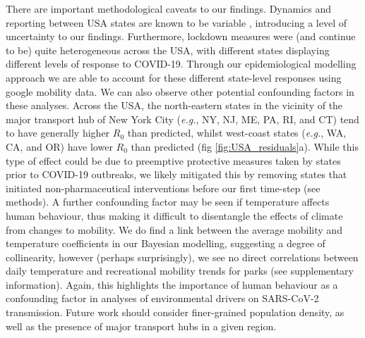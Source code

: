 \documentclass[12pt,english,a4paper]{article}
\newcommand{\virus}{SARS-CoV-2\xspace}
\newcommand{\disease}{COVID-19\xspace}
\newcommand{\RO}{$R_0$\xspace}
\begin{document}
There are important methodological caveats to our findings.
Dynamics and reporting between USA states are known to be variable \cite{Javan2020}, introducing a level of uncertainty to our findings. 
Furthermore, lockdown measures were (and continue to be) quite heterogeneous across the USA, with different states displaying different levels of response to \disease \cite{Neofotistos2020}. Through our epidemiological modelling approach we are able to account for these different state-level responses using google mobility data.
We can also observe other potential confounding factors in these analyses. 
Across the USA, the north-eastern states in the vicinity of the major transport hub of New York City (\emph{e.g.}, NY, NJ, ME, PA, RI, and CT) tend to have generally higher \RO than predicted, whilst west-coast states (\emph{e.g.}, WA, CA, and OR) have lower \RO than predicted (fig \ref{fig:USA_residuals}a).
While this type of effect could be due to preemptive protective measures taken by states prior to \disease outbreaks, we likely mitigated this by removing states that initiated non-pharmaceutical interventions before our first time-step (see methods).
A further confounding factor may be seen if temperature affects human behaviour, thus making it difficult to disentangle the effects of climate from changes to mobility. We do find a link between the average mobility and temperature coefficients in our Bayesian modelling, suggesting a degree of collinearity, however (perhaps surprisingly), we see no direct correlations between daily temperature and recreational mobility trends for parks (see supplementary information). Again, this highlights the importance of human behaviour as a confounding factor in analyses of environmental drivers on \virus transmission. Future work should consider finer-grained population density, as well as the presence of major transport hubs in a given region.
\end{document}
